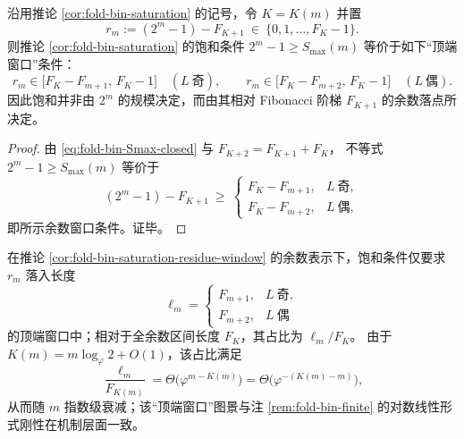 \begin{corollary}\label{cor:fold-bin-saturation-residue-window}
沿用推论 \ref{cor:fold-bin-saturation} 的记号，令 \(K=K(m)\) 并置
\[
r_m:=(2^m-1)-F_{K+1}\ \in\ \{0,1,\dots,F_K-1\}.
\]
则推论 \ref{cor:fold-bin-saturation} 的饱和条件
\(
2^m-1\ge S_{\max}(m)
\)
等价于如下“顶端窗口”条件：
\[
r_m\in\bigl[F_K-F_{m+1},\,F_K-1\bigr]\quad (L\ \text{奇}),
\qquad
r_m\in\bigl[F_K-F_{m+2},\,F_K-1\bigr]\quad (L\ \text{偶}).
\]
因此饱和并非由 \(2^m\) 的规模决定，而由其相对 Fibonacci 阶梯 \(F_{K+1}\) 的余数落点所决定。
\end{corollary}
\begin{proof}
由 \eqref{eq:fold-bin-Smax-closed} 与 \(F_{K+2}=F_{K+1}+F_K\)，
不等式 \(2^m-1\ge S_{\max}(m)\) 等价于
\[
(2^m-1)-F_{K+1}\ \ge\
\begin{cases}
F_K-F_{m+1},& L\ \text{奇},\\
F_K-F_{m+2},& L\ \text{偶},
\end{cases}
\]
即所示余数窗口条件。证毕。
\end{proof}

\begin{corollary}[饱和窗口的相对尺度与指数衰减]\label{cor:fold-bin-saturation-window-density}
在推论 \ref{cor:fold-bin-saturation-residue-window} 的余数表示下，饱和条件仅要求 \(r_m\) 落入长度
\[
\ell_m=
\begin{cases}
F_{m+1},& L\ \text{奇},\\
F_{m+2},& L\ \text{偶}
\end{cases}
\]
的顶端窗口中；相对于全余数区间长度 \(F_K\)，其占比为 \(\ell_m/F_K\)。
由于 \(K(m)=m\log_{\varphi}2+O(1)\)，该占比满足
\[
\frac{\ell_m}{F_{K(m)}}=\Theta\!\bigl(\varphi^{m-K(m)}\bigr)=\Theta\!\bigl(\varphi^{-(K(m)-m)}\bigr),
\]
从而随 \(m\) 指数级衰减；该“顶端窗口”图景与注 \ref{rem:fold-bin-finite} 的对数线性形式刚性在机制层面一致。
\end{corollary}


